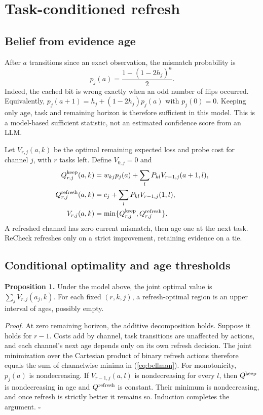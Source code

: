 \documentclass[10pt,letterpaper]{article}
\begin{document}
\section{Task-conditioned refresh}
\subsection{Belief from evidence age}
After $a$ transitions since an exact observation, the mismatch probability is
\begin{equation}
 p_j(a)=\frac{1-(1-2h_j)^a}{2}.
 \label{eq:parity}
\end{equation}
Indeed, the cached bit is wrong exactly when an odd number of flips occurred. Equivalently, $p_j(a+1)=h_j+(1-2h_j)p_j(a)$ with $p_j(0)=0$. Keeping only age, task and remaining horizon is therefore sufficient in this model. This is a model-based sufficient statistic, not an estimated confidence score from an LLM.

Let $V_{r,j}(a,k)$ be the optimal remaining expected loss and probe cost for channel $j$, with $r$ tasks left. Define $V_{0,j}=0$ and
\begin{align}
 Q^{\rm keep}_{r,j}(a,k)&=w_{kj}p_j(a)
       +\sum_lP_{kl}V_{r-1,j}(a+1,l),\\
 Q^{\rm refresh}_{r,j}(a,k)&=c_j
       +\sum_lP_{kl}V_{r-1,j}(1,l),\\
 V_{r,j}(a,k)&=\min\{Q^{\rm keep}_{r,j},Q^{\rm refresh}_{r,j}\}.
 \label{eq:bellman}
\end{align}
A refreshed channel has zero current mismatch, then age one at the next task. ReCheck refreshes only on a strict improvement, retaining evidence on a tie.

\subsection{Conditional optimality and age thresholds}
\textbf{Proposition 1.} Under the model above, the joint optimal value is $\sum_j V_{r,j}(a_j,k)$. For each fixed $(r,k,j)$, a refresh-optimal region is an upper interval of ages, possibly empty.

\emph{Proof.} At zero remaining horizon, the additive decomposition holds. Suppose it holds for $r-1$. Costs add by channel, task transitions are unaffected by actions, and each channel's next age depends only on its own refresh decision. The joint minimization over the Cartesian product of binary refresh actions therefore equals the sum of channelwise minima in (\ref{eq:bellman}). For monotonicity, $p_j(a)$ is nondecreasing. If $V_{r-1,j}(a,l)$ is nondecreasing for every $l$, then $Q^{\rm keep}$ is nondecreasing in age and $Q^{\rm refresh}$ is constant. Their minimum is nondecreasing, and once refresh is strictly better it remains so. Induction completes the argument. $\square$
\end{document}
